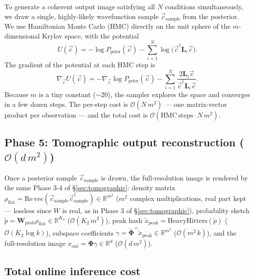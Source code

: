 \documentclass[11pt, a4paper]{article}
\newcommand{\Rset}{\mathbb{R}}
\begin{document}
To generate a coherent output image satisfying all $N$ conditions
simultaneously, we draw a single, highly-likely wavefunction sample
$\vec c_{\mathrm{sample}}$ from the posterior. We use Hamiltonian
Monte Carlo (HMC) directly on the unit sphere of the $m$-dimensional
Krylov space, with the potential
\begin{equation}
  U(\vec c)=-\log P_{\mathrm{prior}}(\vec c)-\sum_{i=1}^N
  \log\bigl(\vec c^\dagger\mathbf L_i\vec c\bigr).
  \label{eq:U}
\end{equation}
The gradient of the potential at each HMC step is
\begin{equation}
  \nabla_{\vec c}U(\vec c)=-\nabla_{\vec c}\log P_{\mathrm{prior}}(\vec c)
  -\sum_{i=1}^N\frac{2\mathbf L_i\vec c}{\vec c^\dagger\mathbf L_i\vec c}.
  \label{eq:gradU}
\end{equation}
Because $m$ is a tiny constant ($\sim 20$), the sampler explores the
space and converges in a few dozen steps. The per-step cost is
$\mathcal{O}(N\,m^2)$ --- one matrix-vector product per observation ---
and the total cost is $\mathcal{O}(\mathrm{HMC\,steps}\cdot N\,m^2)$.

\subsection{Phase 5: Tomographic output reconstruction ($\mathcal{O}(d\,m^2)$)}

Once a posterior sample $\vec c_{\mathrm{sample}}$ is drawn, the
full-resolution image is rendered by the same Phase 3-4 of
\S\ref{sec:tomographic}: density matrix $\rho_{\mathrm{flat}}=
\mathrm{Re}\,\mathrm{vec}(\vec c_{\mathrm{sample}}\vec c_{\mathrm{sample}}^\dagger)
\in\Rset^{m^2}$ ($m^2$ complex multiplications, real part kept --- lossless
since $W$ is real, as in Phase 3 of \S\ref{sec:tomographic}), probability sketch
$\tilde p=\mathbf W_{\mathrm{prob}}\rho_{\mathrm{flat}}\in\Rset^{K_2}$
($\mathcal{O}(K_2\,m^2)$), peak hash
$\tilde x_{\mathrm{peak}}=\mathrm{HeavyHitters}(\tilde p)$
($\mathcal{O}(K_2\log k)$), subspace coefficients
$\gamma=\tilde{\mathbf\Phi}^+\tilde x_{\mathrm{peak}}\in\Rset^{m^2}$
($\mathcal{O}(m^2\,k)$), and the full-resolution image
$x_{\mathrm{out}}=\mathbf\Phi\gamma\in\Rset^d$
($\mathcal{O}(d\,m^2)$).

\subsection{Total online inference cost}
\end{document}
